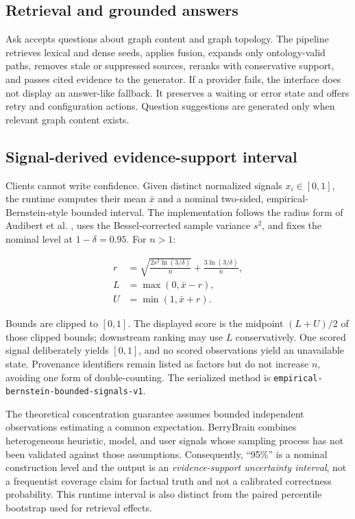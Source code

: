 \documentclass{sbc2023}
\newcommand{\code}[1]{\texttt{#1}}
\begin{document}
\subsection{Retrieval and grounded answers}

Ask accepts questions about graph content and graph topology. The pipeline retrieves lexical and
dense seeds, applies fusion, expands only ontology-valid paths, removes stale or suppressed
sources, reranks with conservative support, and passes cited evidence to the generator. If a
provider fails, the interface does not display an answer-like fallback. It preserves a waiting or
error state and offers retry and configuration actions. Question suggestions are generated only
when relevant graph content exists.

\subsection{Signal-derived evidence-support interval}

Clients cannot write confidence. Given distinct normalized signals $x_i\in[0,1]$, the runtime
computes their mean $\bar{x}$ and a nominal two-sided, empirical-Bernstein-style bounded interval.
The implementation follows the radius form of Audibert et al. \cite{audibert2009exploration},
uses the Bessel-corrected sample variance $s^2$, and fixes the nominal level at $1-\delta=0.95$.
For $n>1$:

\begin{equation}
\begin{aligned}
r&=\sqrt{\frac{2s^2\ln(3/\delta)}{n}}+
\frac{3\ln(3/\delta)}{n},\\
L&=\max(0,\bar{x}-r),\\
U&=\min(1,\bar{x}+r).
\end{aligned}
\end{equation}

Bounds are clipped to $[0,1]$. The displayed score is the midpoint $(L+U)/2$ of those clipped
bounds; downstream ranking may use $L$ conservatively. One scored signal deliberately yields
$[0,1]$, and no scored observations yield an unavailable state. Provenance identifiers remain
listed as factors but do not increase $n$, avoiding one form of double-counting. The serialized
method is \code{empirical-bernstein-bounded-signals-v1}.

The theoretical concentration guarantee assumes bounded independent observations estimating a
common expectation. BerryBrain combines heterogeneous heuristic, model, and user signals whose
sampling process has not been validated against those assumptions. Consequently, ``95\%'' is a
nominal construction level and the output is an \emph{evidence-support uncertainty interval}, not
a frequentist coverage claim for factual truth and not a calibrated correctness probability. This
runtime interval is also distinct from the paired percentile bootstrap used for retrieval effects.
\end{document}
